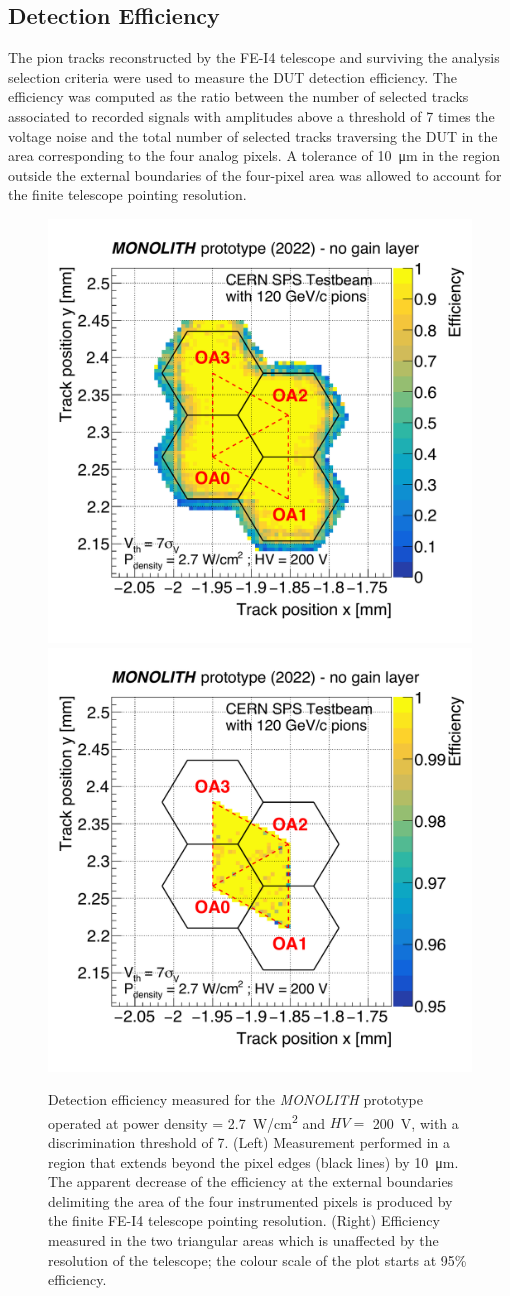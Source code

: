 		\subsection{Detection Efficiency}
		The pion tracks reconstructed by the FE-I4 telescope and surviving the analysis selection criteria were used to measure the DUT detection efficiency. The efficiency was computed as the ratio between the number of selected tracks associated to recorded signals with amplitudes above a threshold of 7 times the voltage noise \noise and the total number of selected tracks traversing the DUT in the area corresponding to the four analog pixels. A tolerance of \SI{10}{\micro\meter} in the region outside the external boundaries of the four-pixel area was allowed to account for the finite telescope pointing resolution.

		\begin{figure}[h]
			\centering
			\includegraphics[width=.49\textwidth,trim=0 0 0 0]{files/MONOLITH_paper/WP1_HV200V_efficiency_map.pdf}
			\includegraphics[width=.49\textwidth,trim=0 0 0 0]{files/MONOLITH_paper/WP1_HV200V_triangles_map.pdf}
			\caption{Detection efficiency measured for the \textit{MONOLITH} prototype operated at power density \power = \SI{2.7}{\watt/\centi\meter^2} and $HV=$ \SI{200}{\volt}, with a discrimination threshold of 7\noise. (Left) Measurement performed in a region that extends beyond the pixel edges (black lines) by \SI{10}{\micro\meter}. The apparent decrease of the efficiency at the external boundaries delimiting the area of the four instrumented pixels is produced by the finite FE-I4 telescope pointing resolution. (Right) Efficiency measured in the two triangular areas which is unaffected by the resolution of the telescope; the colour scale of the plot starts at 95\% efficiency.}
			\label{im:MONO_effmap} 
		\end{figure}

